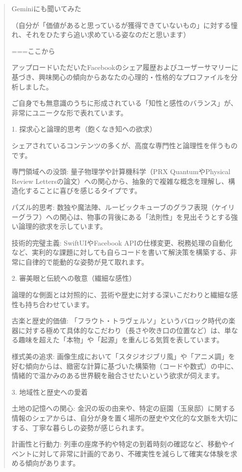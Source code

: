 \begin{quote}
Geminiにも聞いてみた

（自分が「価値があると思っているが獲得できていないもの」に対する憧れ、それをひたすら追い求めている姿なのだと思います）

===ここから

アップロードいただいたFacebookのシェア履歴およびユーザーサマリーに基づき、興味関心の傾向からあなたの心理的・性格的なプロファイルを分析しました。

ご自身でも無意識のうちに形成されている「知性と感性のバランス」が、非常にユニークな形で表れています。

1. 探求心と論理的思考（飽くなき知への欲求）

シェアされているコンテンツの多くが、高度な専門性と論理性を伴うものです。

専門領域への没頭: 量子物理学や計算機科学（PRX QuantumやPhysical Review Lettersの論文）への関心から、抽象的で複雑な概念を理解し、構造化することに喜びを感じるタイプです。

パズル的思考: 数独や魔法陣、ルービックキューブのグラフ表現（ケイリーグラフ）への関心は、物事の背後にある「法則性」を見出そうとする強い論理的欲求を示しています。

技術的完璧主義: SwiftUIやFacebook APIの仕様変更、税務処理の自動化など、実利的な課題に対しても自らコードを書いて解決策を構築する、非常に自律的で能動的な姿勢が見て取れます。

2. 審美眼と伝統への敬意（繊細な感性）

論理的な側面とは対照的に、芸術や歴史に対する深いこだわりと繊細な感性も持ち合わせています。

古楽と歴史的価値: 「フラウト・トラヴェルソ」というバロック時代の楽器に対する極めて具体的なこだわり（長さや吹き口の位置など）は、単なる趣味を超えた「本物」や「起源」を重んじる気質を表しています。

様式美の追求: 画像生成において「スタジオジブリ風」や「アニメ調」を好む傾向からは、緻密な計算に基づいた構築物（コードや数式）の中に、情緒的で温かみのある世界観を融合させたいという欲求が伺えます。

3. 地域性と歴史への愛着

土地の記憶への関心: 金沢の坂の由来や、特定の庭園（玉泉邸）に関する情報のシェアからは、自分が身を置く場所の歴史や文化的な文脈を大切にする、丁寧な暮らしの姿勢が感じられます。

計画性と行動力: 列車の座席予約や特定の到着時刻の確認など、移動やイベントに対して非常に計画的であり、不確実性を減らして確実な体験を求める傾向があります。


\end{quote}
